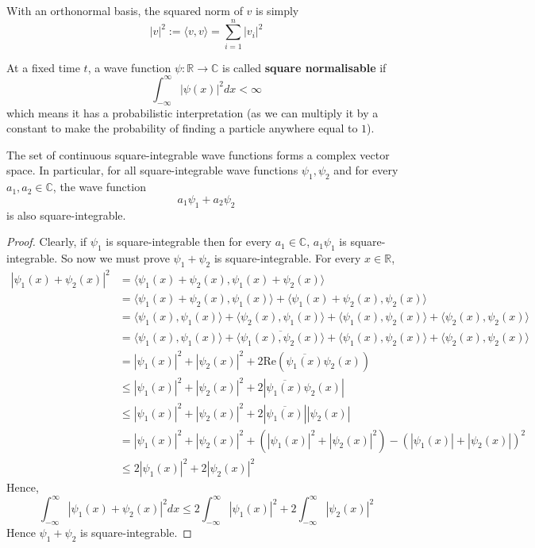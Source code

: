 \begin{remark}
	With an orthonormal basis, the squared norm of $v$ is simply
	\[
		|v|^2 := \langle v, v \rangle = \sum_{i = 1}^{n} |v_i|^2
	\]
\end{remark}

\begin{definition}
	At a fixed time $t$, a wave function $\psi: \mathbb{R} \rightarrow \mathbb{C}$ is called \textbf{square normalisable} if
	\[
		\int_{-\infty}^{\infty} |\psi(x)|^2 dx < \infty
	\]
	which means it has a probabilistic interpretation (as we can multiply it by a constant to make the probability of finding a particle anywhere equal to $1$).
\end{definition}

\begin{proposition}
	The set of continuous square-integrable wave functions forms a complex vector space. In particular, for all square-integrable wave functions $\psi_1, \psi_2$ and for every $a_1, a_2 \in \mathbb{C}$, the wave function
	\[
		a_1 \psi_1 + a_2 \psi_2
	\]
	is also square-integrable.
\end{proposition}

\begin{proof}
	Clearly, if $\psi_1$ is square-integrable then for every $a_1 \in \mathbb{C}$, $a_1 \psi_1$ is square-integrable. So now we must prove $\psi_1 + \psi_2$ is square-integrable. For every $x \in \mathbb{R}$,
	\[
		\begin{aligned}
			|\psi_1(x) + \psi_2(x)|^2
				& = \langle \psi_1(x) + \psi_2(x), \psi_1(x) + \psi_2(x) \rangle \\
				& = \langle \psi_1(x) + \psi_2(x), \psi_1(x) \rangle + \langle \psi_1(x) + \psi_2(x), \psi_2(x) \rangle \\
				& = \langle \psi_1(x), \psi_1(x) \rangle + \langle \psi_2(x), \psi_1(x) \rangle + \langle \psi_1(x), \psi_2(x) \rangle + \langle \psi_2(x), \psi_2(x) \rangle \\
				& = \langle \psi_1(x), \psi_1(x) \rangle + \overline{\langle \psi_1(x), \psi_2(x) \rangle} + \langle \psi_1(x), \psi_2(x) \rangle + \langle \psi_2(x), \psi_2(x) \rangle \\
				& = |\psi_1(x)|^2 + |\psi_2(x)|^2 + 2 \text{Re}(\overline{\psi_1(x)} \psi_2(x)) \\
				& \le |\psi_1(x)|^2 + |\psi_2(x)|^2 + 2 |\overline{\psi_1(x)} \psi_2(x)| \\
				& \le |\psi_1(x)|^2 + |\psi_2(x)|^2 + 2 |\overline{\psi_1(x)}| |\psi_2(x)| \\
				& = |\psi_1(x)|^2 + |\psi_2(x)|^2 + (|\psi_1(x)|^2 + |\psi_2(x)|^2) - {(|\psi_1(x)| + |\psi_2(x)|)}^2 \\
				& \le 2 |\psi_1(x)|^2 + 2 |\psi_2(x)|^2
		\end{aligned}
	\]
	Hence,
	\[
		\int_{-\infty}^{\infty} |\psi_1(x) + \psi_2(x)|^2 dx \le 2 \int_{-\infty}^{\infty} |\psi_1(x)|^2 + 2 \int_{-\infty}^{\infty} |\psi_2(x)|^2
	\]
	Hence $\psi_1 + \psi_2$ is square-integrable.
\end{proof}

